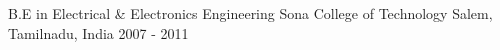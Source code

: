 

\begin{cventries}

  \cventry
    {B.E in Electrical \& Electronics Engineering} %
    {Sona College of Technology} %
    {Salem, Tamilnadu, India} %
    {2007 - 2011} %
    {}
\end{cventries}
